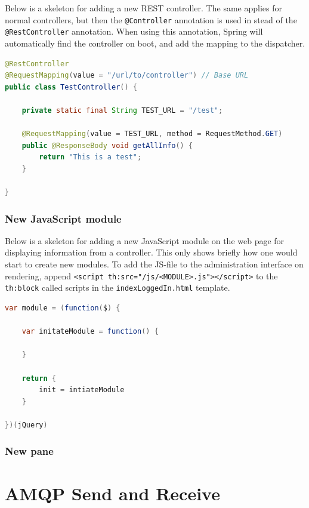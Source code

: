 Below is a skeleton for adding a new REST controller. The same applies for normal controllers, but then the \verb!@Controller! annotation is used in stead of the \verb!@RestController! annotation. When using this annotation, Spring will automatically find the controller on boot, and add the mapping to the dispatcher. 

\begin{lstlisting}[language=Java, captionpos=b, caption=Skeleton for a REST-controller, frame=bt]
@RestController
@RequestMapping(value = "/url/to/controller") // Base URL
public class TestController() {
    
    private static final String TEST_URL = "/test";
    
    @RequestMapping(value = TEST_URL, method = RequestMethod.GET)
    public @ResponseBody void getAllInfo() {
        return "This is a test";
    }
    
}
\end{lstlisting}

\subsubsection{New JavaScript module}

Below is a skeleton for adding a new JavaScript module on the web page for displaying information from a controller. This only shows briefly how one would start to create new modules. To add the JS-file to the administration interface on rendering, append \verb!<script th:src="/js/<MODULE>.js"></script>! to the \verb!th:block! called scripts in the \verb!indexLoggedIn.html! template. 


\begin{lstlisting}[language=Java, captionpos=b, caption=Skeleton for a JavaScript module, frame=bt]
var module = (function($) { 

    var initateModule = function() {
    
    }

    return {
        init = intiateModule
    }

})(jQuery)
\end{lstlisting}

\subsubsection{New pane}

\section{AMQP Send and Receive}

\clearpage